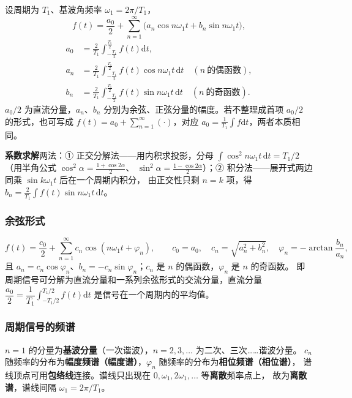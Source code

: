 设周期为 $T_1$、基波角频率 $\omega_1=2\pi/T_1$，
\begin{equation}
f(t)=\frac{a_0}{2}+\sum_{n=1}^{\infty}\big(a_n\cos n\omega_1t+b_n\sin n\omega_1t\big),
\end{equation}
\begin{align}
a_0&=\frac{2}{T_1}\int_{-\frac{T_1}{2}}^{\frac{T_1}{2}}f(t)\mathrm{d}t,\\
a_n&=\frac{2}{T_1}\int_{-\frac{T_1}{2}}^{\frac{T_1}{2}}f(t)\cos n\omega_1t\,\mathrm{d}t\quad(n\ \text{的偶函数}),\\
b_n&=\frac{2}{T_1}\int_{-\frac{T_1}{2}}^{\frac{T_1}{2}}f(t)\sin n\omega_1t\,\mathrm{d}t\quad(n\ \text{的奇函数}).
\end{align}
$a_0/2$ 为直流分量，$a_n$、$b_n$ 分别为余弦、正弦分量的幅度。若不整理成首项 $a_0/2$ 的形式，也可写成
$f(t)=a_0+\sum_{n=1}^{\infty}(\cdot)$，对应 $a_0=\frac{1}{T_1}\int f\mathrm{d}t$，两者本质相同。

\textbf{系数求解}两法：① 正交分解法——用内积求投影，分母
$\int\cos^2n\omega_1t\,\mathrm{d}t=T_1/2$（用半角公式 $\cos^2\alpha=\frac{1+\cos2\alpha}{2}$、
$\sin^2\alpha=\frac{1-\cos2\alpha}{2}$）；② 积分法——展开式两边同乘 $\sin k\omega_1t$ 后在一个周期内积分，
由正交性只剩 $n=k$ 项，得 $b_n=\frac{2}{T_1}\int f(t)\sin n\omega_1t\,\mathrm{d}t$。

\subsubsection{余弦形式}

\begin{equation}
f(t)=\frac{c_0}{2}+\sum_{n=1}^{\infty}c_n\cos(n\omega_1t+\varphi_n),\qquad
c_0=a_0,\quad c_n=\sqrt{a_n^2+b_n^2},\quad \varphi_n=-\arctan\frac{b_n}{a_n},
\end{equation}
且 $a_n=c_n\cos\varphi_n$、$b_n=-c_n\sin\varphi_n$；$c_n$ 是 $n$ 的偶函数，$\varphi_n$ 是 $n$ 的奇函数。
即周期信号可分解为直流分量和一系列余弦形式的交流分量，直流分量
$\dfrac{a_0}{2}=\dfrac{1}{T_1}\displaystyle\int_{-T_1/2}^{T_1/2}f(t)\mathrm{d}t$ 是信号在一个周期内的平均值。

\subsubsection{周期信号的频谱}

$n=1$ 的分量为\textbf{基波分量}（一次谐波），$n=2,3,\dots$ 为二次、三次……谐波分量。
$c_n$ 随频率的分布为\textbf{幅度频谱（幅度谱）}，$\varphi_n$ 随频率的分布为\textbf{相位频谱（相位谱）}，
谱线顶点可用\textbf{包络线}连接。谱线只出现在 $0,\omega_1,2\omega_1,\dots$ 等\textbf{离散}频率点上，
故为\textbf{离散谱}，谱线间隔 $\omega_1=2\pi/T_1$。

